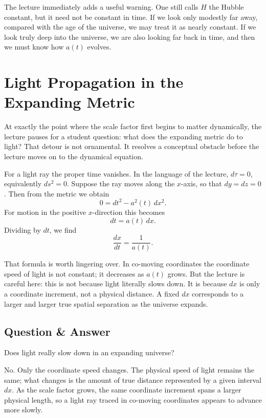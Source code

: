 The lecture immediately adds a useful warning. One still calls \(H\) the Hubble constant, but it need not be constant in time. If we look only modestly far away, compared with the age of the universe, we may treat it as nearly constant. If we look truly deep into the universe, we are also looking far back in time, and then we must know how \(a(t)\) evolves.

\section{Light Propagation in the Expanding Metric}

At exactly the point where the scale factor first begins to matter dynamically, the lecture pauses for a student question: what does the expanding metric do to light? That detour is not ornamental. It resolves a conceptual obstacle before the lecture moves on to the dynamical equation.

For a light ray the proper time vanishes. In the language of the lecture, \(d\tau=0\), equivalently \(ds^2=0\). Suppose the ray moves along the \(x\)-axis, so that \(dy=dz=0\). Then from the metric we obtain
\begin{equation}
0 = dt^2 - a^2(t)\,dx^2.
\end{equation}
For motion in the positive \(x\)-direction this becomes
\begin{equation}
dt = a(t)\,dx.
\end{equation}
Dividing by \(dt\), we find
\begin{equation}
\frac{dx}{dt} = \frac{1}{a(t)}.
\end{equation}

That formula is worth lingering over. In co-moving coordinates the coordinate speed of light is not constant; it decreases as \(a(t)\) grows. But the lecture is careful here: this is not because light literally slows down. It is because \(dx\) is only a coordinate increment, not a physical distance. A fixed \(dx\) corresponds to a larger and larger true spatial separation as the universe expands.

\subsection{Question \& Answer}

Does light really slow down in an expanding universe?

No. Only the coordinate speed changes. The physical speed of light remains the same; what changes is the amount of true distance represented by a given interval \(dx\). As the scale factor grows, the same coordinate increment spans a larger physical length, so a light ray traced in co-moving coordinates appears to advance more slowly.

